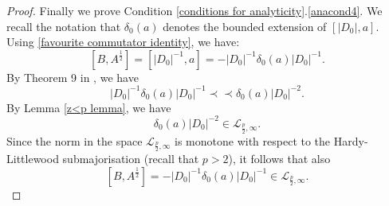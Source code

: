 \begin{proof}
        Finally we prove Condition \ref{conditions for analyticity}.\eqref{anacond4}. We recall the notation that $\delta_0(a)$ denotes the bounded extension of $[|D_0|,a]$. 
        Using \eqref{favourite commutator identity}, we have:
        $$[B,A^{\frac12}]=[|D_0|^{-1},a]=-|D_0|^{-1}\delta_0(a)|D_0|^{-1}.$$
        By Theorem 9 in \cite{sbik}, we have
        $$|D_0|^{-1}\delta_0(a)|D_0|^{-1}\prec\prec \delta_0(a)|D_0|^{-2}.$$
        By Lemma \ref{z<p lemma}, we have 
        $$\delta_0(a)|D_0|^{-2}\in\mathcal{L}_{\frac{p}{2},\infty}.$$
        Since the norm in the space $\mathcal{L}_{\frac{p}{2},\infty}$ is monotone with respect to the Hardy-Littlewood submajorisation (recall that $p>2$), it follows that also
        $$[B,A^{\frac12}]=-|D_0|^{-1}\delta_0(a)|D_0|^{-1}\in\mathcal{L}_{\frac{p}{2},\infty}.$$
    \end{proof}
    
